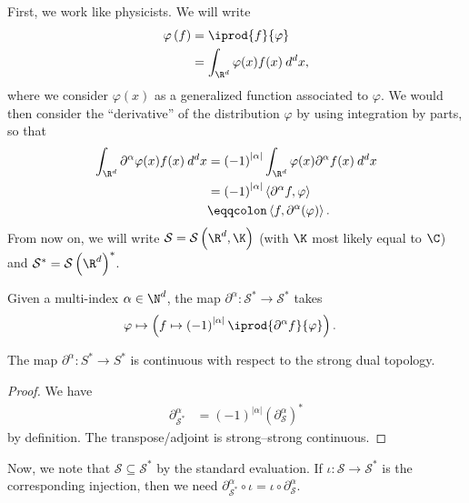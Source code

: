 \documentclass[10pt]{mypackage}
\renewcommand{\eqcolon}{\eqqcolon}
\begin{document}
First, we work like physicists. We will write
\begin{align*}
  \varphi\left( f \right) &= \iprod{f}{\varphi}\\
                          &= \int_{\R^d}^{} \varphi(x)f(x)\:d^{d}x,
\end{align*}
where we consider $\varphi(x)$ as a generalized function associated to $\varphi$. We would then consider the ``derivative'' of the distribution $\varphi$ by using integration by parts, so that
\begin{align*}
  \int_{\R^d}^{} \partial^{\alpha}\varphi(x)f(x)\:d^{d}x &= \left( -1 \right)^{\left\vert \alpha \right\vert} \int_{\R^d}^{} \varphi(x)\partial^{\alpha}f(x)\:d^{d}x\\
                                                         &= \left( -1 \right)^{\left\vert \alpha \right\vert}\left\langle \partial^{\alpha}f,\varphi \right\rangle\\
                                                         &\eqcolon \left\langle f,\partial^{\alpha}(\varphi) \right\rangle.
\end{align*}
From now on, we will write $\mathcal{S} = \mathcal{S}\left( \R^d,\K \right)$ (with $\K$ most likely equal to $\C$) and $\mathcal{S}^{\ast} = \mathcal{S}\left( \R^d \right)^{\ast}$.
\begin{definition}
  Given a multi-index $\alpha\in \N^d$, the map $\partial^{\alpha}\colon \mathcal{S}^{\ast}\to \mathcal{S}^{\ast}$ takes
  \begin{align*}
    \varphi &\mapsto \left( f\mapsto \left( -1 \right)^{\left\vert \alpha \right\vert}\iprod{\partial^{\alpha}f}{\varphi} \right).
  \end{align*}
\end{definition}
\begin{proposition}
  The map $\partial^{\alpha}\colon S^{\ast}\rightarrow S^{\ast}$ is continuous with respect to the strong dual topology.
\end{proposition}
\begin{proof}
  We have
  \begin{align*}
    \partial^{\alpha}_{\mathcal{S}^{\ast}} &= \left( -1 \right)^{\left\vert \alpha \right\vert}\left( \partial^{\alpha}_{\mathcal{S}} \right)^{\ast}
  \end{align*}
  by definition. The transpose/adjoint is strong--strong continuous.
\end{proof}
Now, we note that $\mathcal{S}\subseteq \mathcal{S}^{\ast}$ by the standard evaluation. If $\iota\colon \mathcal{S}\to \mathcal{S}^{\ast}$ is the corresponding injection, then we need $\partial^{\alpha}_{\mathcal{S}^{\ast}} \circ \iota = \iota\circ \partial^{\alpha}_{\mathcal{S}}$.
\end{document}

